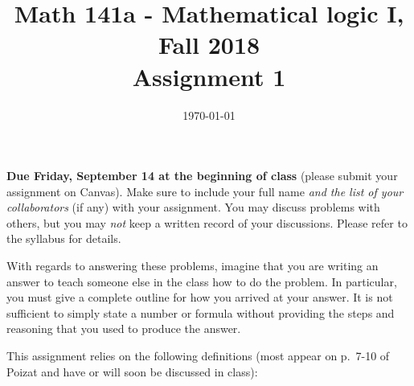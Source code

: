 \documentclass{amsart}
\title[Math 141a, Fall 2018: assignment 1]{Math 141a - Mathematical logic I, Fall 2018 \\ Assignment 1}
\date{\today}
\theoremstyle{definition}
\begin{document}

\maketitle

\textbf{Due Friday, September 14 at the beginning of class} (please submit your assignment on Canvas). Make sure to include your full name \emph{and the list of your collaborators} (if any) with your assignment. You may discuss problems with others, but you may \emph{not} keep a written record of your discussions. Please refer to the syllabus for details.

With regards to answering these problems, imagine that you are writing an answer to teach someone else in the class how to do the problem. In particular, you must give a complete outline for how you arrived at your answer. It is not sufficient to simply state a number or formula without providing the steps and reasoning that you used to produce the answer.

This assignment relies on the following definitions (most appear on p.~7-10 of Poizat and have or will soon be discussed in class):
\end{document}
